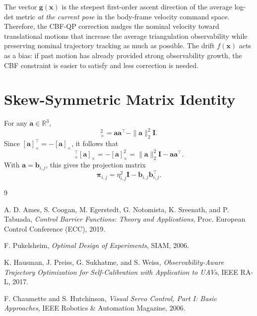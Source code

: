 \documentclass[11pt,a4paper]{article}
\newcommand{\R}{\mathbb{R}}
\newcommand{\sx}[1]{[#1]_{\times}}
\begin{document}
The vector $\bm{g}(\bm{x})$ is the steepest first-order ascent direction of the
average log-det metric \emph{at the current pose} in the body-frame velocity
command space.  Therefore, the CBF-QP correction nudges the nominal velocity
toward translational motions that increase the average triangulation
observability while preserving nominal trajectory tracking as much as possible.
The drift $f(\bm{x})$ acts as a bias: if past motion has already provided
strong observability growth, the CBF constraint is easier to satisfy and less
correction is needed.

\appendix
\section{Skew-Symmetric Matrix Identity}
\label{app:skew_identity}

For any $\bm{a}\in\R^3$,
\begin{equation}
  \sx{\bm{a}}^2 = \bm{a}\bm{a}^{\top}-\|\bm{a}\|_2^2\bm{I}.
\end{equation}
Since $\sx{\bm{a}}^{\top}=-\sx{\bm{a}}$, it follows that
\begin{equation}
  \sx{\bm{a}}^{\top}\sx{\bm{a}}
  = -\sx{\bm{a}}^2
  = \|\bm{a}\|_2^2\bm{I}-\bm{a}\bm{a}^{\top}.
\end{equation}
With $\bm{a}=\bm{b}_{i,j}$, this gives the projection matrix
\begin{equation}
  \bm{\pi}_{i,j}
  = \eta_{i,j}^{2}\bm{I}-\bm{b}_{i,j}\bm{b}_{i,j}^{\top}.
\end{equation}

\begin{thebibliography}{9}

A. D. Ames, S. Coogan, M. Egerstedt, G. Notomista, K. Sreenath, and P. Tabuada,
\textit{Control Barrier Functions: Theory and Applications},
Proc. European Control Conference (ECC), 2019.

F. Pukelsheim,
\textit{Optimal Design of Experiments},
SIAM, 2006.

K. Hausman, J. Preiss, G. Sukhatme, and S. Weiss,
\textit{Observability-Aware Trajectory Optimization for Self-Calibration with Application to UAVs},
IEEE RA-L, 2017.

F. Chaumette and S. Hutchinson,
\textit{Visual Servo Control, Part I: Basic Approaches},
IEEE Robotics \& Automation Magazine, 2006.

\end{thebibliography}
\end{document}
